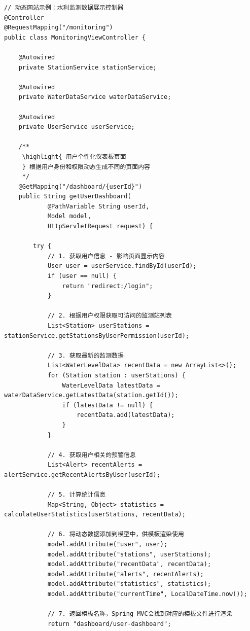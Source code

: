 \begin{lstlisting}[style=java]
// 动态网站示例：水利监测数据展示控制器
@Controller
@RequestMapping("/monitoring")
public class MonitoringViewController {
    
    @Autowired
    private StationService stationService;
    
    @Autowired
    private WaterDataService waterDataService;
    
    @Autowired
    private UserService userService;
    
    /**
     \highlight{ 用户个性化仪表板页面
     } 根据用户身份和权限动态生成不同的页面内容
     */
    @GetMapping("/dashboard/{userId}")
    public String getUserDashboard(
            @PathVariable String userId, 
            Model model,
            HttpServletRequest request) {
        
        try {
            // 1. 获取用户信息 - 影响页面显示内容
            User user = userService.findById(userId);
            if (user == null) {
                return "redirect:/login";
            }
            
            // 2. 根据用户权限获取可访问的监测站列表
            List<Station> userStations = stationService.getStationsByUserPermission(userId);
            
            // 3. 获取最新的监测数据
            List<WaterLevelData> recentData = new ArrayList<>();
            for (Station station : userStations) {
                WaterLevelData latestData = waterDataService.getLatestData(station.getId());
                if (latestData != null) {
                    recentData.add(latestData);
                }
            }
            
            // 4. 获取用户相关的预警信息
            List<Alert> recentAlerts = alertService.getRecentAlertsByUser(userId);
            
            // 5. 计算统计信息
            Map<String, Object> statistics = calculateUserStatistics(userStations, recentData);
            
            // 6. 将动态数据添加到模型中，供模板渲染使用
            model.addAttribute("user", user);
            model.addAttribute("stations", userStations);
            model.addAttribute("recentData", recentData);
            model.addAttribute("alerts", recentAlerts);
            model.addAttribute("statistics", statistics);
            model.addAttribute("currentTime", LocalDateTime.now());
            
            // 7. 返回模板名称，Spring MVC会找到对应的模板文件进行渲染
            return "dashboard/user-dashboard";
            

\end{lstlisting}
